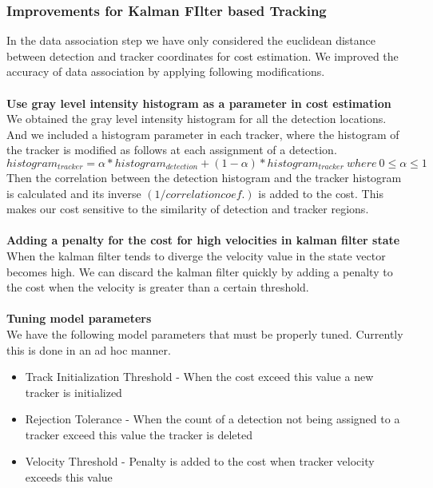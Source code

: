 \documentclass[12pt,a4paper]{report}
\begin{document}
\subsubsection{\large Improvements for Kalman FIlter based Tracking}
In the data association step we have only considered the euclidean distance between detection and tracker coordinates for cost estimation. We improved the accuracy of data association by applying following modifications.\\\\
\textbf{Use gray level intensity histogram as a parameter in cost estimation}\\
We obtained the gray level intensity histogram for all the detection locations. And we included a histogram parameter in each tracker, where the histogram of the tracker is modified as follows at each assignment of a detection.
\begin{equation}
\label{eq2}
histogram_{tracker} = \alpha* histogram_{detection} + (1-\alpha) *histogram_{tracker}\        where\ 0\leq \alpha \leq1
\end{equation}
Then the correlation between the detection histogram and the tracker histogram is calculated and its inverse $(1/correlation coef.)$ is added to the cost. This makes our cost sensitive to the similarity of detection and tracker regions.\\\\
\textbf{Adding a penalty for the cost for high velocities in kalman filter state}\\
When the kalman filter tends to diverge the velocity value in the state vector becomes high. We can discard the kalman filter quickly by adding a penalty to the cost when the velocity is greater than a certain threshold.\\\\
\textbf{Tuning model parameters}\\
We have the following model parameters that must be properly tuned. Currently this is done in an ad hoc manner.
\begin{itemize}
\item Track Initialization Threshold - When the cost exceed this value a new tracker is initialized
\item Rejection Tolerance - When the count of a detection not being assigned to a tracker exceed this value the tracker is deleted
\item Velocity Threshold - Penalty is added to the cost when tracker velocity exceeds this value
\end{itemize}
\end{document}
